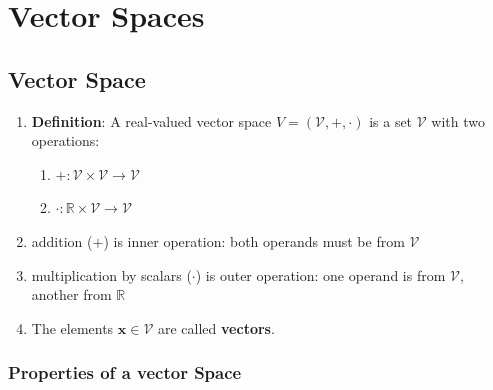 \chapter{Vector Spaces}


\section{Vector Space}

\begin{enumerate}
    \item \textbf{Definition}: A real-valued vector space $V = (\mathcal{V}, +, \cdot)$ is a set $\mathcal{V}$ with two operations:
    \hfill \cite{mfml/book/mml/Deisenroth-Faisal-Ong}
    \begin{enumerate}
        \item[] $+ :  \mathcal{V} \times \mathcal{V} \to \mathcal{V}$
        \hfill \cite{mfml/book/mml/Deisenroth-Faisal-Ong}

        \item[] $\cdot: \mathbb{R} \times \mathcal{V} \to \mathcal{V}$ 
        \hfill \cite{mfml/book/mml/Deisenroth-Faisal-Ong}
    \end{enumerate}


    \item addition ($+$) is inner operation: both operands must be from $\mathcal{V}$
    \hfill \cite{mfml/book/mml/Deisenroth-Faisal-Ong}

    \item multiplication by scalars ($\cdot$) is outer operation: one operand is from $\mathcal{V}$, another from $\mathbb{R}$
    \hfill \cite{mfml/book/mml/Deisenroth-Faisal-Ong}

    \item The elements $\bm{x} \in \mathcal{V}$ are called \textbf{vectors}.
    \hfill \cite{mfml/book/mml/Deisenroth-Faisal-Ong}
\end{enumerate}


\subsection{Properties of a vector Space}

